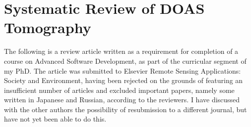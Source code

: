 \chapter{Systematic Review of DOAS Tomography}
\label{ap:tomDoas}

The following is a review article written as a requirement for
completion of a course on Advanced Software Development, as part of the
curricular segment of my PhD. The article was submitted to Elsevier
Remote Sensing Applications: Society and Environment, having been
rejected on the grounds of featuring an insufficient number of articles
and excluded important papers, namely some written in Japanese and
Russian, according to the reviewers. I have discussed with the other
authors the possibility of resubmission to a different journal, but have
not yet been able to do this.


